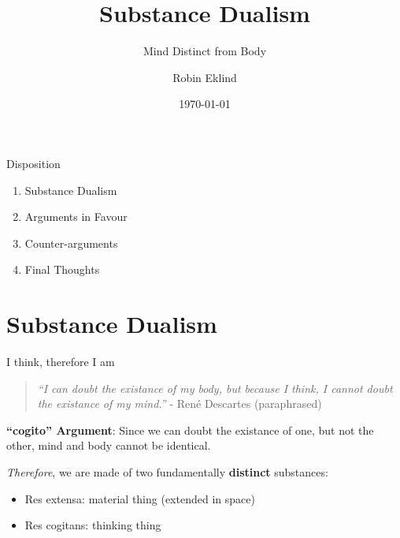 \documentclass[aspectratio=1610]{beamer}
\title{Substance Dualism}
\subtitle{Mind Distinct from Body}
\date{\today}
\author{Robin Eklind}
\begin{document}

\maketitle


\begin{frame}{Disposition}
	\begin{enumerate}
		\item Substance Dualism
		\item Arguments in Favour
		\item Counter-arguments
		\item Final Thoughts
	\end{enumerate}
\end{frame}


\section{Substance Dualism}


\begin{frame}{I think, therefore I am}
	\begin{quote}
		\textit{``I can doubt the existance of my body, but because I think, I cannot doubt the existance of my mind.''}
		- René Descartes {\tiny (paraphrased)}
	\end{quote}

	\pause
	\vspace{2em}

	\textbf{``cogito'' Argument}: Since we can doubt the existance of one, but not the other, mind and body cannot be identical.

	\pause
	\vspace{2em}

	\emph{Therefore}, we are made of two fundamentally \textbf{distinct} substances:
	\begin{itemize}
		\item \alert{Res extensa}: material thing (extended in space)
		\item \alert{Res cogitans}: thinking thing
	\end{itemize}

\end{frame}
\end{document}
